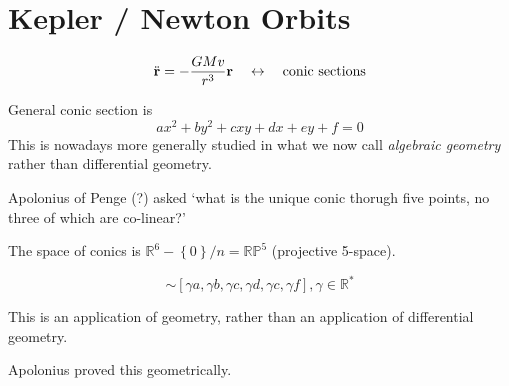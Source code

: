 
\section{Kepler / Newton Orbits}%
\label{sec:kepler_newton_orbits}

\begin{equation}
  \ddot{\vb{r}} = -\frac{G M v}{r^3} \vb{r} \quad \leftrightarrow \quad \text{conic sections}
\end{equation}


General conic section is
\begin{equation}
  ax^2 + by^2 + cxy + dx + ey + f = 0
\end{equation}
This is nowadays more generally studied in what we now call \emph{algebraic geometry} rather than differential geometry.

Apolonius of Penge (?) asked `what is the unique conic thorugh five points, no three of which are co-linear?'

The space of conics is $\mathbb{R}^6 - \left\{ 0 \right\} / n = \mathbb{RP}^5$  (projective 5-space).

\begin{equation}
  [a,b, c, d, e, f] \sim [\gamma a, \gamma b, \gamma c, \gamma d, \gamma c, \gamma f], \gamma \in \mathbb{R}^*
\end{equation}

This is an application of geometry, rather than an application of differential geometry.
\begin{remark}
  Apolonius proved this geometrically. 
\end{remark}

